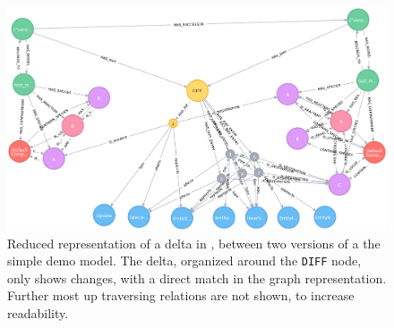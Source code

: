 \begin{figure}
	\centering
	\includegraphics[width=\textwidth]{resources/neo4j-renders/demo-sbml-simple-diff.pdf}
	\caption[Reduced representation of a delta in \masymos, between two versions of a the simple \sbml demo model]{Reduced representation of a delta in \masymos, between two versions of a the simple \sbml demo model. The delta, organized around the \texttt{DIFF} node, only shows changes, with a direct match in the graph representation. Further most up traversing relations are not shown, to increase readability.}
	\label{fig:results:simple-diff}
\end{figure}